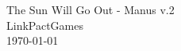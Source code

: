\documentclass{book}
\begin{document}
\begin{titlepage}
\vfill
\centering
{\Huge The Sun Will Go Out - Manus v.2}\\[1cm]
{\Large LinkPactGames}\\[0.6cm]
\today
\vfill
\end{titlepage}
\end{document}
